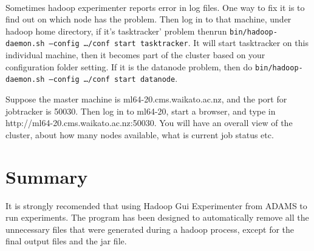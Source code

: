 \documentclass[a4paper]{book}
\begin{document}
\\
\noindent Sometimes hadoop experimenter reports error in log files. One way to fix it is to find out
on which node has the problem. Then log in to
that machine, under hadoop home directory, if it's tasktracker' problem thenrun
\texttt {bin/hadoop-daemon.sh --config \ldots/conf start tasktracker}. It will start
tasktracker on this individual machine, then it becomes part of the cluster
based on your configuration folder setting. If it is the datanode problem, then
do \texttt{bin/hadoop-daemon.sh --config \ldots/conf start datanode}.


\noindent Suppose the master machine is ml64-20.cms.waikato.ac.nz, and the port
for jobtracker is 50030. Then log in to ml64-20, start a browser, and type in 
http://ml64-20.cms.waikato.ac.nz:50030. You will have an overall view of the
cluster, about how many nodes available, what is current job status etc.



\chapter{Summary}
It is strongly recomended that using Hadoop Gui Experimenter from ADAMS to run
experiments. The program has been designed to automatically remove all the
unnecessary files that were generated during a hadoop process, except for the final
output files and the jar file.\\
\end{document}
